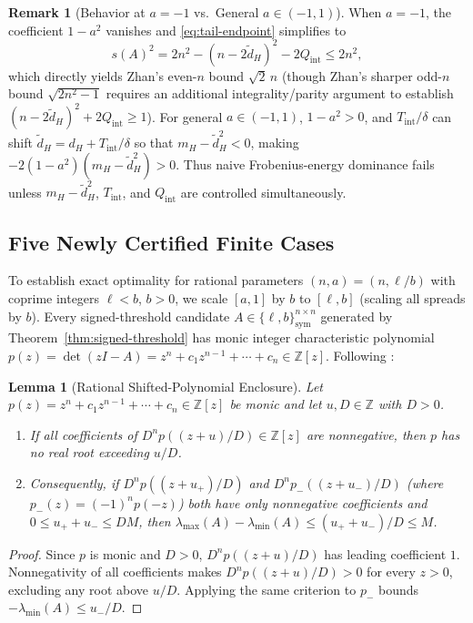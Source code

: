 \documentclass[11pt,reqno]{article}
\newtheorem{lemma}[theorem]{Lemma}
\theoremstyle{definition}
\newtheorem{remark}[theorem]{Remark}
\newcommand{\Z}{\mathbb{Z}}
\begin{document}
\begin{remark}[Behavior at $a = -1$ vs.\ General $a \in (-1, 1)$]
When $a = -1$, the coefficient $1 - a^2$ vanishes and \eqref{eq:tail-endpoint} simplifies to
\[
s(A)^2 = 2n^2 - (n - 2\tilde{d}_H)^2 - 2Q_{\mathrm{int}} \le 2n^2,
\]
which directly yields Zhan's even-$n$ bound $\sqrt{2}\,n$ (though Zhan's sharper odd-$n$ bound $\sqrt{2n^2 - 1}$ requires an additional integrality/parity argument to establish $(n - 2\tilde{d}_H)^2 + 2Q_{\mathrm{int}} \ge 1$). For general $a \in (-1, 1)$, $1 - a^2 > 0$, and $T_{\mathrm{int}}/\delta$ can shift $\tilde{d}_H = d_H + T_{\mathrm{int}}/\delta$ so that $m_H - \tilde{d}_H^2 < 0$, making $-2(1-a^2)(m_H - \tilde{d}_H^2) > 0$. Thus naive Frobenius-energy dominance fails unless $m_H - \tilde{d}_H^2$, $T_{\mathrm{int}}$, and $Q_{\mathrm{int}}$ are controlled simultaneously.
\end{remark}

\subsection{Five Newly Certified Finite Cases}

To establish exact optimality for rational parameters $(n, a) = (n, \ell / b)$ with coprime integers $\ell < b$, $b > 0$, we scale $[a, 1]$ by $b$ to $[\ell, b]$ (scaling all spreads by $b$). Every signed-threshold candidate $A \in \{\ell, b\}^{n \times n}_{\text{sym}}$ generated by Theorem~\ref{thm:signed-threshold} has monic integer characteristic polynomial $p(z) = \det(zI - A) = z^n + c_1 z^{n-1} + \cdots + c_n \in \Z[z]$. Following \cite{holden2026a}:

\begin{lemma}[Rational Shifted-Polynomial Enclosure]\label{lem:poly-shift}
Let $p(z) = z^n + c_1 z^{n-1} + \cdots + c_n \in \Z[z]$ be monic and let $u, D \in \Z$ with $D > 0$.
\begin{enumerate}
    \item If all coefficients of $D^n p((z+u)/D) \in \Z[z]$ are nonnegative, then $p$ has no real root exceeding $u/D$.
    \item Consequently, if $D^n p((z + u_+)/D)$ and $D^n p_-((z + u_-)/D)$ (where $p_-(z) = (-1)^n p(-z)$) both have only nonnegative coefficients and $0 \le u_+ + u_- \le D M$, then $\lambda_{\max}(A) - \lambda_{\min}(A) \le (u_+ + u_-)/D \le M$.
\end{enumerate}
\end{lemma}
\begin{proof}
Since $p$ is monic and $D > 0$, $D^n p((z+u)/D)$ has leading coefficient $1$. Nonnegativity of all coefficients makes $D^n p((z+u)/D) > 0$ for every $z > 0$, excluding any root above $u/D$. Applying the same criterion to $p_-$ bounds $-\lambda_{\min}(A) \le u_-/D$.
\end{proof}
\end{document}
